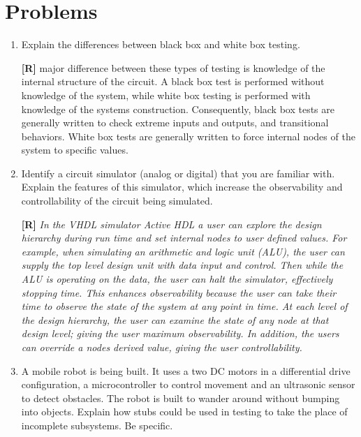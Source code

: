 \section{Problems}
\label{section:testingProblems}

\begin{enumerate}
\def\labelenumi{\arabic{enumi}.}
\item
  Explain the differences between black box and white box testing.

  \begin{onlysolution}
    \textbf{[R]}
    \itshapeThe major difference between these types of testing is knowledge of the internal structure of the circuit. 
    A black box test is performed without knowledge of the system, while white box testing is performed with knowledge 
    of the systems construction. Consequently, black box tests are generally written to check extreme inputs and outputs, 
    and transitional behaviors. White box tests are generally written to force internal nodes of the system to specific values.
  \end{onlysolution}

\item
  Identify a circuit simulator (analog or digital) that you are familiar
  with. Explain the features of this simulator, which increase the
  observability and controllability of the circuit being simulated.

  \begin{onlysolution}
    \textbf{[R]}
    \itshape
    In the VHDL simulator Active HDL a user can explore the design hierarchy during run time and set internal nodes to 
    user defined values. For example, when simulating an arithmetic and logic unit (ALU), the user can supply the top 
    level design unit with data input and control. Then while the ALU is operating on the data, the user can halt the 
    simulator, effectively stopping time. This enhances observability because the user can take their time to observe 
    the state of the system at any point in time. At each level of the design hierarchy, the user can examine the state 
    of any node at that design level; giving the user maximum observability. In addition, the users can override a nodes 
    derived value, giving the user controllability.
  \end{onlysolution}

  \item
  A mobile robot is being built. It uses a two DC motors in a
  differential drive configuration, a microcontroller to control
  movement and an ultrasonic sensor to detect obstacles. The robot is
  built to wander around without bumping into objects. Explain how stubs
  could be used in testing to take the place of incomplete subsystems.
  Be specific.


\end{enumerate}
